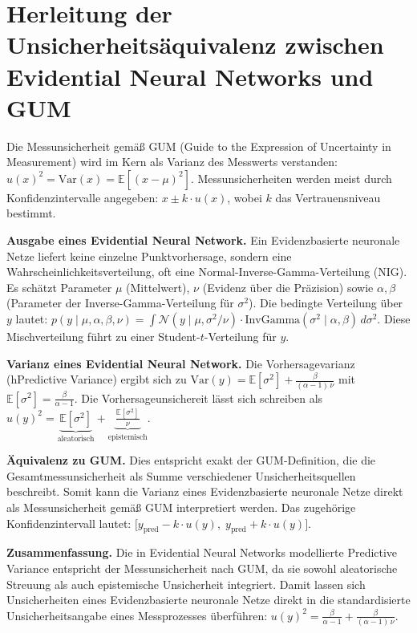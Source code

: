 \pagebreak

\section*{Herleitung der Unsicherheitsäquivalenz zwischen Evidential Neural Networks und GUM}
\label{sec:enn_gum_derivation}

Die Messunsicherheit gemäß GUM (Guide to the Expression of Uncertainty in Measurement) wird im Kern als Varianz des Messwerts verstanden: $u(x)^2 = \mathrm{Var}(x) = \mathbb{E}[(x - \mu)^2]$. Messunsicherheiten werden meist durch Konfidenzintervalle angegeben: $x \pm k \cdot u(x)$, wobei $k$ das Vertrauensniveau bestimmt.

\textbf{Ausgabe eines Evidential Neural Network.} Ein \gls{Evidenzbasierte neuronale Netze} liefert keine einzelne Punktvorhersage, sondern eine Wahrscheinlichkeitsverteilung, oft eine Normal-Inverse-Gamma-Verteilung (NIG). Es schätzt Parameter $\mu$ (Mittelwert), $\nu$ (Evidenz über die Präzision) sowie $\alpha, \beta$ (Parameter der Inverse-Gamma-Verteilung für $\sigma^2$). Die bedingte Verteilung über $y$ lautet: $p(y \mid \mu, \alpha, \beta, \nu) = \int \mathcal{N}(y \mid \mu, \sigma^2/\nu) \cdot \mathrm{InvGamma}(\sigma^2 \mid \alpha, \beta)\, d\sigma^2$. Diese Mischverteilung führt zu einer Student-$t$-Verteilung für $y$.

\textbf{Varianz eines Evidential Neural Network.} Die Vorhersagevarianz (hPredictive Variance) ergibt sich zu $\mathrm{Var}(y) = \mathbb{E}[\sigma^2] + \frac{\beta}{(\alpha - 1)\, \nu}$ mit $\mathbb{E}[\sigma^2] = \frac{\beta}{\alpha - 1}$. Die Vorhersageunsichereit lässt sich schreiben als $u(y)^2 = \underbrace{\mathbb{E}[\sigma^2]}_{\text{aleatorisch}} + \underbrace{\frac{\mathbb{E}[\sigma^2]}{\nu}}_{\text{epistemisch}}$.

\textbf{Äquivalenz zu GUM.} Dies entspricht exakt der GUM-Definition, die die Gesamtmessunsicherheit als Summe verschiedener Unsicherheitsquellen beschreibt. Somit kann die Varianz eines \gls{Evidenzbasierte neuronale Netze} direkt als Messunsicherheit gemäß GUM interpretiert werden. Das zugehörige Konfidenzintervall lautet: $\bigl[y_\text{pred} - k \cdot u(y), \; y_\text{pred} + k \cdot u(y)\bigr]$.

\textbf{Zusammenfassung.} Die in Evidential Neural Networks modellierte Predictive Variance entspricht der Messunsicherheit nach GUM, da sie sowohl aleatorische Streuung als auch epistemische Unsicherheit integriert. Damit lassen sich Unsicherheiten eines \gls{Evidenzbasierte neuronale Netze} direkt in die standardisierte Unsicherheitsangabe eines Messprozesses überführen: $u(y)^2 = \frac{\beta}{\alpha - 1} + \frac{\beta}{(\alpha - 1)\, \nu}$.
